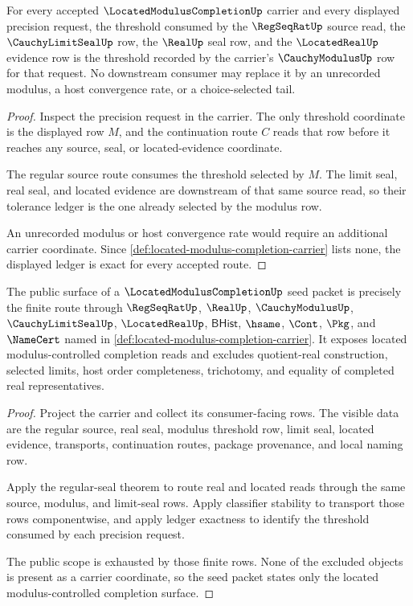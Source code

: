 \begin{theorem}
\label{thm:located-modulus-completion-ledger-exactness}
For every accepted $\LocatedModulusCompletionUp$ carrier and every displayed precision request, the threshold consumed by the $\RegSeqRatUp$ source read, the $\CauchyLimitSealUp$ row, the $\RealUp$ seal row, and the $\LocatedRealUp$ evidence row is the threshold recorded by the carrier's $\CauchyModulusUp$ row for that request. No downstream consumer may replace it by an unrecorded modulus, a host convergence rate, or a choice-selected tail.
\end{theorem}
\begin{proof}
Inspect the precision request in the carrier. The only threshold coordinate is the displayed row $M$, and the continuation route $C$ reads that row before it reaches any source, seal, or located-evidence coordinate.

The regular source route consumes the threshold selected by $M$. The limit seal, real seal, and located evidence are downstream of that same source read, so their tolerance ledger is the one already selected by the modulus row.

An unrecorded modulus or host convergence rate would require an additional carrier coordinate. Since \autoref{def:located-modulus-completion-carrier} lists none, the displayed ledger is exact for every accepted route.
\end{proof}

\begin{theorem}
\label{thm:located-modulus-completion-public-scope}
The public surface of a $\LocatedModulusCompletionUp$ seed packet is precisely the finite route through $\RegSeqRatUp$, $\RealUp$, $\CauchyModulusUp$, $\CauchyLimitSealUp$, $\LocatedRealUp$, $\mathsf{BHist}$, $\hsame$, $\Cont$, $\Pkg$, and $\NameCert$ named in \autoref{def:located-modulus-completion-carrier}. It exposes located modulus-controlled completion reads and excludes quotient-real construction, selected limits, host order completeness, trichotomy, and equality of completed real representatives.
\end{theorem}
\begin{proof}
Project the carrier and collect its consumer-facing rows. The visible data are the regular source, real seal, modulus threshold row, limit seal, located evidence, transports, continuation routes, package provenance, and local naming row.

Apply the regular-seal theorem to route real and located reads through the same source, modulus, and limit-seal rows. Apply classifier stability to transport those rows componentwise, and apply ledger exactness to identify the threshold consumed by each precision request.

The public scope is exhausted by those finite rows. None of the excluded objects is present as a carrier coordinate, so the seed packet states only the located modulus-controlled completion surface.
\end{proof}

